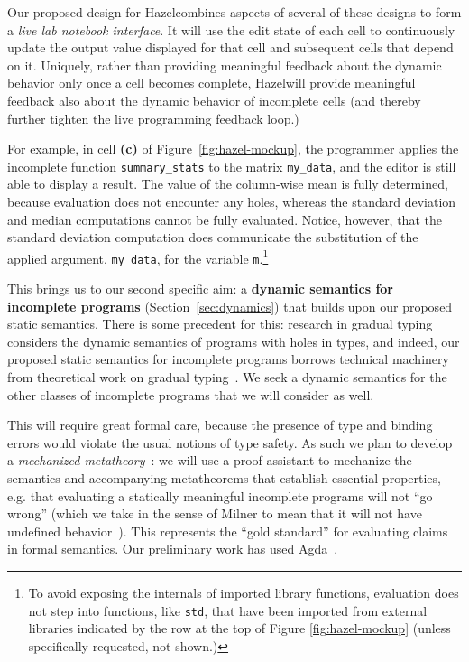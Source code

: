 \documentclass[letterpaper,USenglish]{lipics-v2016}
\let\li\lstinline
\newcommand{\Hazel}[0]{\textsf{Hazel}}
\newcommand{\HazelEnv}[0]{\Hazel}
\begin{document}
Our proposed design for \HazelEnv combines aspects of several of these designs to form a \emph{live lab notebook interface}. 
It will use the edit state of each cell to continuously update the output
value displayed for that cell and subsequent cells that depend on
it. Uniquely, rather than providing meaningful feedback about the dynamic
behavior only once a cell becomes complete, \HazelEnv will provide meaningful feedback also
about the dynamic behavior of incomplete cells (and thereby further tighten the live programming 
feedback loop.)

For example, in cell \textbf{(c)} of Figure~\ref{fig:hazel-mockup}, the
programmer applies  the incomplete function \li{summary_stats} to 
the matrix \lstinline{my_data}, and 
the editor is still able to display a result.
The value of the column-wise mean is fully determined, because evaluation does
not encounter any holes, whereas the standard deviation and median computations
cannot be fully evaluated. Notice, however, that the standard
deviation computation does communicate the substitution of the applied argument,
\li{my_data}, for the variable \li{m}.\footnote{To avoid exposing the internals
of imported library functions, evaluation does not step into functions, like
\li{std}, that have been imported from external libraries indicated by the row at the top of Figure \ref{fig:hazel-mockup} (unless specifically
requested, not shown.)}

This brings us to our second specific aim: a
\textbf{dynamic semantics for incomplete programs} (Section~\ref{sec:dynamics}) that builds upon our proposed
static semantics. There is some precedent for this: research in gradual typing
considers the dynamic semantics of programs with holes in types, and indeed, our
proposed static semantics for incomplete programs borrows technical machinery
from theoretical work on gradual typing~\cite{Siek06a}. We seek a dynamic semantics for the
other classes of incomplete programs that we will consider as well.

This will require great formal care, because the presence of type
and binding errors would violate the usual notions of type safety. As such we plan to develop a \emph{mechanized
  metatheory}~\cite{Lee:2007:TMM:1190216.1190245}: we will use a proof assistant to mechanize the semantics and
accompanying metatheorems that establish essential properties, e.g. that
evaluating a statically meaningful incomplete programs will not ``go wrong'' (which we take in
the sense of Milner to mean that it will not have undefined behavior~\cite{milner1978theory,pfpl}).
This represents the ``gold standard'' for evaluating claims in formal
semantics.  Our preliminary work has used Agda~\cite{norell2009dependently}.
\end{document}
